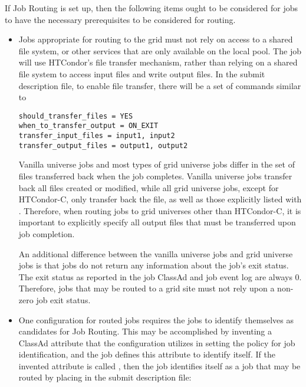 If Job Routing is set up, then the following items
ought to be considered for jobs to have the
necessary prerequisites to be considered for routing.

\begin{itemize}

\item Jobs appropriate for routing to the grid must not rely on access to
a shared file system, or other services that are only available on the
local pool.
The job will use HTCondor's file transfer mechanism, 
rather than relying on a shared file system
to access input files and write output files.
In the submit description file, to enable file transfer, there
will be a set of commands similar to

\begin{verbatim}
should_transfer_files = YES
when_to_transfer_output = ON_EXIT
transfer_input_files = input1, input2
transfer_output_files = output1, output2
\end{verbatim}

Vanilla universe jobs and most types of grid universe jobs differ in the
set of files transferred back when the job completes.
Vanilla universe jobs transfer back all files created or modified,
while all grid universe jobs,
except for HTCondor-C,
only transfer back the  file,
as well as those explicitly listed
with .
Therefore, when routing jobs to grid universes other than HTCondor-C, it is
important to explicitly specify all
output files that must be transferred upon job completion.

An additional difference between the vanilla universe jobs
and  grid universe jobs
is that  jobs do not return
any information about the job's exit status.
The exit status as reported in the job ClassAd and job event log are
always 0.
Therefore, jobs that may be routed to a  grid site
must not rely upon a non-zero job exit status.

\item One configuration for routed jobs requires the jobs to
identify themselves as candidates for Job Routing.
This may be accomplished by inventing a ClassAd attribute
that the configuration utilizes in setting the policy 
for job identification,
and the job defines this attribute to identify itself.
If the invented attribute is called ,
then the job identifies itself as a job that may be routed
by placing in the submit description file:


\end{itemize}
